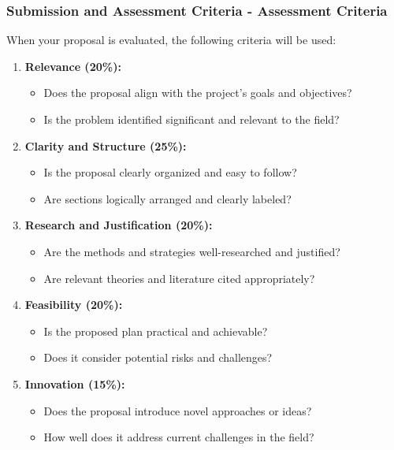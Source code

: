 \documentclass[aspectratio=169]{beamer}
\begin{document}
\begin{frame}[fragile]
\frametitle{Submission and Assessment Criteria - Assessment Criteria}
When your proposal is evaluated, the following criteria will be used:

\begin{enumerate}
    \item \textbf{Relevance (20\%):}
    \begin{itemize}
        \item Does the proposal align with the project's goals and objectives?
        \item Is the problem identified significant and relevant to the field?
    \end{itemize}

    \item \textbf{Clarity and Structure (25\%):}
    \begin{itemize}
        \item Is the proposal clearly organized and easy to follow?
        \item Are sections logically arranged and clearly labeled?
    \end{itemize}

    \item \textbf{Research and Justification (20\%):}
    \begin{itemize}
        \item Are the methods and strategies well-researched and justified?
        \item Are relevant theories and literature cited appropriately?
    \end{itemize}

    \item \textbf{Feasibility (20\%):}
    \begin{itemize}
        \item Is the proposed plan practical and achievable?
        \item Does it consider potential risks and challenges?
    \end{itemize}

    \item \textbf{Innovation (15\%):}
    \begin{itemize}
        \item Does the proposal introduce novel approaches or ideas?
        \item How well does it address current challenges in the field?
    \end{itemize}
\end{enumerate}
\end{frame}
\end{document}
